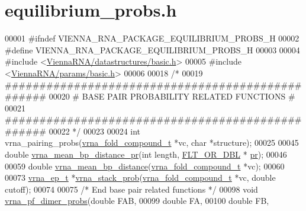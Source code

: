 \hypertarget{equilibrium__probs_8h_source}{}\section{equilibrium\+\_\+probs.\+h}
\label{equilibrium__probs_8h_source}

\begin{DoxyCode}
00001 \textcolor{preprocessor}{#ifndef VIENNA\_RNA\_PACKAGE\_EQUILIBRIUM\_PROBS\_H}
00002 \textcolor{preprocessor}{#define VIENNA\_RNA\_PACKAGE\_EQUILIBRIUM\_PROBS\_H}
00003 
00004 \textcolor{preprocessor}{#include <\hyperlink{datastructures_2basic_8h}{ViennaRNA/datastructures/basic.h}>}
00005 \textcolor{preprocessor}{#include <\hyperlink{params_2basic_8h}{ViennaRNA/params/basic.h}>}
00006 
00018 \textcolor{comment}{/*}
00019 \textcolor{comment}{#################################################}
00020 \textcolor{comment}{# BASE PAIR PROBABILITY RELATED FUNCTIONS       #}
00021 \textcolor{comment}{#################################################}
00022 \textcolor{comment}{*/}
00023 
00024 \textcolor{keywordtype}{int}  vrna\_pairing\_probs(\hyperlink{group__fold__compound_structvrna__fc__s}{vrna\_fold\_compound\_t} *vc, \textcolor{keywordtype}{char} *structure);
00025 
00045 \textcolor{keywordtype}{double} \hyperlink{group__part__func__global_gad3f0c240512e6d43e2e4d4c2076021f5}{vrna\_mean\_bp\_distance\_pr}(\textcolor{keywordtype}{int} length, \hyperlink{group__data__structures_ga31125aeace516926bf7f251f759b6126}{FLT\_OR\_DBL} *
      \hyperlink{fold__vars_8h_ac98ec419070aee6831b44e5c700f090f}{pr});
00046 
00059 \textcolor{keywordtype}{double} \hyperlink{group__part__func__global_gaa6b8983b559b9ef4b2e1b31113ea317b}{vrna\_mean\_bp\_distance}(\hyperlink{group__fold__compound_structvrna__fc__s}{vrna\_fold\_compound\_t} *vc);
00060 
00073 \hyperlink{group__struct__utils__plist_structvrna__elem__prob__s}{vrna\_ep\_t} *\hyperlink{group__part__func__global_ga132664bf29fdc30bb5ea715491d1ab22}{vrna\_stack\_prob}(\hyperlink{group__fold__compound_structvrna__fc__s}{vrna\_fold\_compound\_t} *vc, \textcolor{keywordtype}{double} 
      cutoff);
00074 
00075 \textcolor{comment}{/* End base pair related functions */}
00098 \textcolor{keywordtype}{void}  \hyperlink{group__part__func__global_gaa1e39e73afb51fbaf4ae38f0c066c46b}{vrna\_pf\_dimer\_probs}(\textcolor{keywordtype}{double}                  FAB,
00099                           \textcolor{keywordtype}{double}                  FA,
00100                           \textcolor{keywordtype}{double}                  FB,

\end{DoxyCode}
